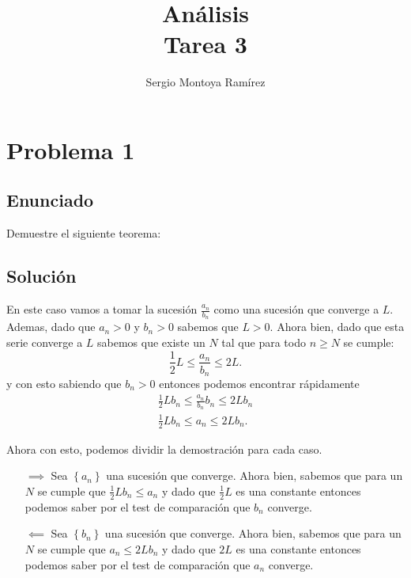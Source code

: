 \documentclass{report}
\title{\Huge{Análisis}\\Tarea 3}
\author{\huge{Sergio Montoya Ramírez}}
\date{}
\begin{document}
\maketitle
\newpage%
\tableofcontents
\pagebreak

\chapter{Problema 1}
\section{Enunciado}
Demuestre el siguiente teorema:
\section{Solución}


En este caso vamos a tomar la sucesión $\frac{a_n}{b_n}$ como una sucesión que converge a $L$. Ademas, dado que $a_n > 0$ y $b_n > 0$ sabemos que $L > 0$. Ahora bien, dado que esta serie converge a $L$ sabemos que existe un $N$ tal que para todo $n \ge N$ se cumple: \[
\frac{1}{2}L \le  \frac{a_n}{b_n} \le 2L
.\] y con esto sabiendo que $b_n > 0$ entonces podemos encontrar rápidamente 
\begin{align*}
  \frac{1}{2}Lb_n \le \frac{a_n}{b_n}b_n \le 2Lb_n\\
  \frac{1}{2}Lb_n \le a_n \le 2Lb_n
.\end{align*}

Ahora con esto, podemos dividir la demostración para cada caso.
\begin{enumerate}
  \item[$\implies$] Sea $\left\{ a_n \right\} $ una sucesión que converge. Ahora bien, sabemos que para un $N$ se cumple que $\frac{1}{2}Lb_n \le a_n$ y dado que $\frac{1}{2}L$ es una constante entonces podemos saber por el test de comparación que $b_n$ converge.
  \item[$\impliedby$] Sea $\left\{ b_n \right\} $ una sucesión que converge. Ahora bien, sabemos que para un $N$ se cumple que $a_n \le 2L b_n$ y dado que $2L$ es una constante entonces podemos saber por el test de comparación que $a_n$ converge.
\end{enumerate}
\end{document}
